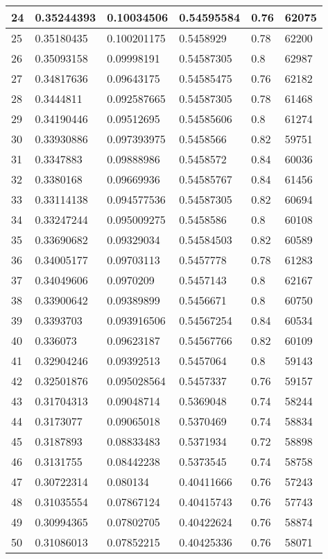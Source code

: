 \begin{longtable}{|l|l|l|l|l|l|}
24 & 0.35244393 & 0.10034506 & 0.54595584 & 0.76 & 62075 \\ \hline 
25 & 0.35180435 & 0.100201175 & 0.5458929 & 0.78 & 62200 \\ \hline 
26 & 0.35093158 & 0.09998191 & 0.54587305 & 0.8 & 62987 \\ \hline 
27 & 0.34817636 & 0.09643175 & 0.54585475 & 0.76 & 62182 \\ \hline 
28 & 0.3444811 & 0.092587665 & 0.54587305 & 0.78 & 61468 \\ \hline 
29 & 0.34190446 & 0.09512695 & 0.54585606 & 0.8 & 61274 \\ \hline 
30 & 0.33930886 & 0.097393975 & 0.5458566 & 0.82 & 59751 \\ \hline 
31 & 0.3347883 & 0.09888986 & 0.5458572 & 0.84 & 60036 \\ \hline 
32 & 0.3380168 & 0.09669936 & 0.54585767 & 0.84 & 61456 \\ \hline 
33 & 0.33114138 & 0.094577536 & 0.54587305 & 0.82 & 60694 \\ \hline 
34 & 0.33247244 & 0.095009275 & 0.5458586 & 0.8 & 60108 \\ \hline 
35 & 0.33690682 & 0.09329034 & 0.54584503 & 0.82 & 60589 \\ \hline 
36 & 0.34005177 & 0.09703113 & 0.5457778 & 0.78 & 61283 \\ \hline 
37 & 0.34049606 & 0.0970209 & 0.5457143 & 0.8 & 62167 \\ \hline 
38 & 0.33900642 & 0.09389899 & 0.5456671 & 0.8 & 60750 \\ \hline 
39 & 0.3393703 & 0.093916506 & 0.54567254 & 0.84 & 60534 \\ \hline 
40 & 0.336073 & 0.09623187 & 0.54567766 & 0.82 & 60109 \\ \hline 
41 & 0.32904246 & 0.09392513 & 0.5457064 & 0.8 & 59143 \\ \hline 
42 & 0.32501876 & 0.095028564 & 0.5457337 & 0.76 & 59157 \\ \hline 
43 & 0.31704313 & 0.09048714 & 0.5369048 & 0.74 & 58244 \\ \hline 
44 & 0.3173077 & 0.09065018 & 0.5370469 & 0.74 & 58834 \\ \hline 
45 & 0.3187893 & 0.08833483 & 0.5371934 & 0.72 & 58898 \\ \hline 
46 & 0.3131755 & 0.08442238 & 0.5373545 & 0.74 & 58758 \\ \hline 
47 & 0.30722314 & 0.080134 & 0.40411666 & 0.76 & 57243 \\ \hline 
48 & 0.31035554 & 0.07867124 & 0.40415743 & 0.76 & 57743 \\ \hline 
49 & 0.30994365 & 0.07802705 & 0.40422624 & 0.76 & 58874 \\ \hline 
50 & 0.31086013 & 0.07852215 & 0.40425336 & 0.76 & 58071 \\ \hline 
\end{longtable}